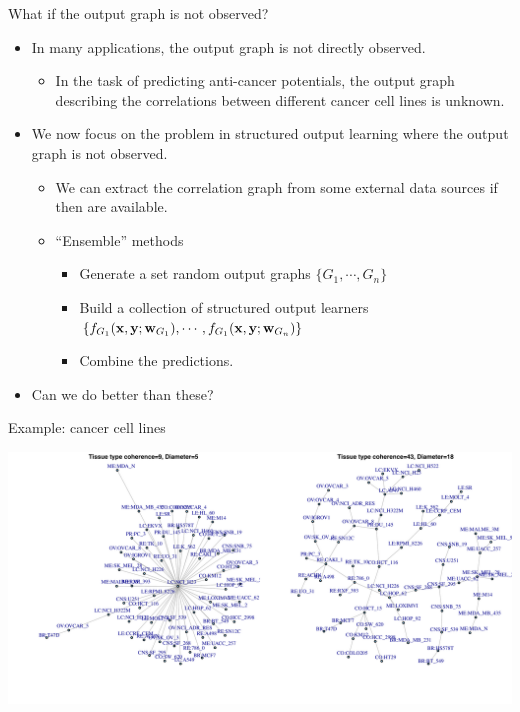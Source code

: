 \documentclass[first=dgreen,second=purple,logo=yellowexc]{aaltoslides}
\begin{document}
{\begin{frame}{What if the output graph is not observed?}
	\begin{itemize}
		\item In many applications, the output graph is not directly observed.
		\begin{itemize}
			\footnotesize
			\item In the task of predicting anti-cancer potentials, the output graph describing the correlations between different cancer cell lines is unknown.
		\end{itemize}
		\item We now focus on the problem in structured output learning where the output graph is not observed.
		\begin{itemize}
			\footnotesize
			\item We can extract the correlation graph from some external data sources if then are available.
			\item ``Ensemble'' methods
			\begin{itemize}
				\footnotesize
				\item Generate a set random output graphs $\{G_1,\cdots,G_n\}$
				\item Build a collection of structured output learners $\{f_{G_1}(\mathbf {x},\mathbf {y};\mathbf {w}_{G_1}),\cdots,f_{G_1}(\mathbf {x},\mathbf {y};\mathbf {w}_{G_n})\}$
				\item Combine the predictions.
			\end{itemize}
		\end{itemize}
		\item Can we do better than these?
	\end{itemize}
\end{frame}

\begin{frame}{Example: cancer cell lines}
	\begin{center}
		\includegraphics[scale=0.4]{./figures/cancernet.pdf}
	\end{center}
\end{frame}



}
\end{document}
